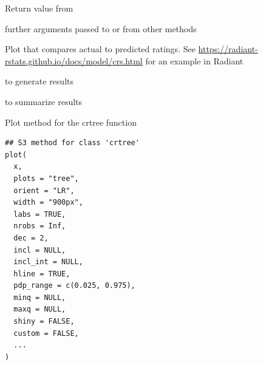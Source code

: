 \documentclass[a4paper]{book}
\begin{document}
%
\begin{Arguments}
\begin{ldescription}
\item[\code{x}] Return value from 

\item[\code{...}] further arguments passed to or from other methods
\end{ldescription}
\end{Arguments}
%
\begin{Details}
Plot that compares actual to predicted ratings. See \url{https://radiant-rstats.github.io/docs/model/crs.html} for an example in Radiant
\end{Details}
%
\begin{SeeAlso}
 to generate results

 to summarize results
\end{SeeAlso}
%
\begin{Description}
Plot method for the crtree function
\end{Description}
%
\begin{Usage}
\begin{verbatim}
## S3 method for class 'crtree'
plot(
  x,
  plots = "tree",
  orient = "LR",
  width = "900px",
  labs = TRUE,
  nrobs = Inf,
  dec = 2,
  incl = NULL,
  incl_int = NULL,
  hline = TRUE,
  pdp_range = c(0.025, 0.975),
  minq = NULL,
  maxq = NULL,
  shiny = FALSE,
  custom = FALSE,
  ...
)
\end{verbatim}
\end{Usage}
%
\end{document}
